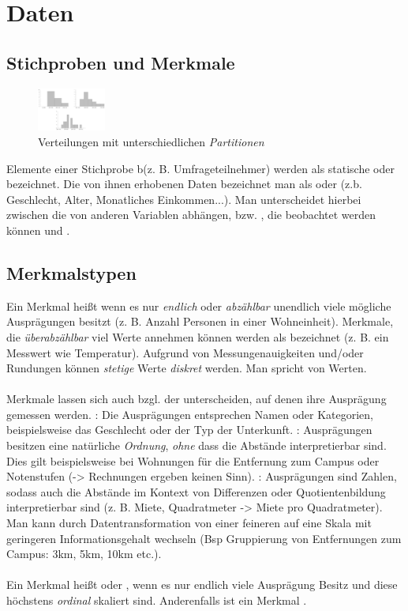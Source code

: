 \section{Daten}
\subsection{Stichproben und Merkmale}
\begin{figure}
    \centering
    \includegraphics[width=0.2\textwidth]{images/2.2_histogramme.png}
    \caption{Verteilungen mit unterschiedlichen \emph{Partitionen}}
    \label{fig:histogramme-binning}
    
\end{figure}
Elemente einer Stichprobe b(z. B. Umfrageteilnehmer) werden als statische  oder  bezeichnet.
Die von ihnen erhobenen Daten bezeichnet man als  oder  (z.b. Geschlecht, Alter, Monatliches Einkommen...). 
Man unterscheidet hierbei zwischen  die von anderen Variablen abhängen,  bzw. , die beobachtet werden können und .
\subsection{Merkmalstypen}
Ein Merkmal heißt  wenn es nur \emph{endlich} oder \emph{abzählbar} unendlich viele mögliche Ausprägungen besitzt (z. B. Anzahl Personen in einer Wohneinheit). Merkmale, die \emph{überabzählbar} viel Werte annehmen können werden als   bezeichnet (z. B. ein Messwert wie Temperatur). Aufgrund von Messungenauigkeiten und/oder Rundungen können \emph{stetige} Werte \emph{diskret} werden. Man spricht von  Werten. 
\\\\
Merkmale lassen sich auch bzgl. der  unterscheiden, auf denen ihre Ausprägung gemessen werden. : Die Ausprägungen entsprechen Namen oder Kategorien, beispielsweise das Geschlecht oder der Typ der Unterkunft. : Ausprägungen besitzen eine natürliche \emph{Ordnung}, \emph{ohne} dass
die Abstände interpretierbar sind. Dies gilt beispielsweise bei Wohnungen für die Entfernung zum Campus oder Notenstufen (-> Rechnungen ergeben keinen Sinn). 
: Ausprägungen sind Zahlen, sodass auch die Abstände im Kontext von Differenzen oder Quotientenbildung interpretierbar sind (z. B. Miete, Quadratmeter -> Miete pro Quadratmeter).
Man kann durch Datentransformation von einer feineren auf eine Skala mit geringeren Informationsgehalt wechseln (Bsp Gruppierung von Entfernungen zum Campus: 3km, 5km, 10km etc.).
\\\\
Ein Merkmal heißt  oder , wenn es nur endlich viele Ausprägung Besitz und diese höchstens \emph{ordinal} skaliert sind.
Anderenfalls ist ein Merkmal .


